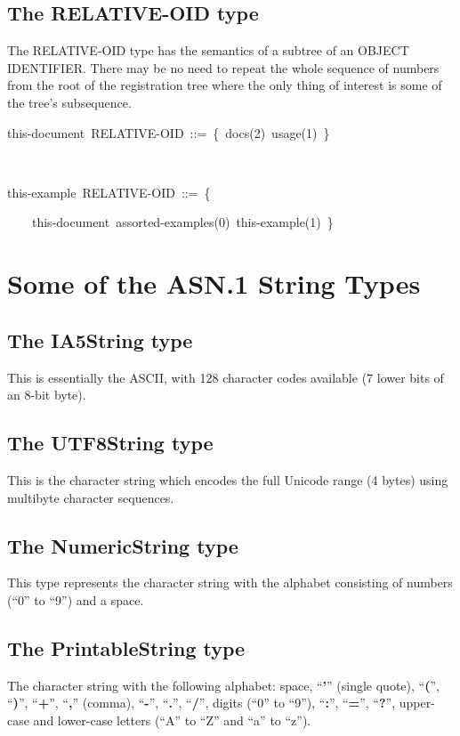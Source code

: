 \documentclass[english,oneside,12pt]{book}
\newenvironment{lyxcode}
{\par\begin{list}{}{
\setlength{\rightmargin}{\leftmargin}
\setlength{\listparindent}{0pt}%
\raggedright
\setlength{\itemsep}{0pt}
\setlength{\parsep}{0pt}
\normalfont\ttfamily}%
 \item[]}
{\end{list}}
\begin{document}
\subsection{The RELATIVE-OID type}

The RELATIVE-OID type has the semantics of a subtree of an OBJECT
IDENTIFIER. There may be no need to repeat the whole sequence of numbers
from the root of the registration tree where the only thing of interest
is some of the tree's subsequence.
\begin{lyxcode}
this-document~RELATIVE-OID~::=~\{~docs(2)~usage(1)~\}

~

this-example~RELATIVE-OID~::=~\{

~~~~this-document~assorted-examples(0)~this-example(1)~\}
\end{lyxcode}

\section{Some of the ASN.1 String Types}


\subsection{The IA5String type}

This is essentially the ASCII, with 128 character codes available
(7 lower bits of an 8-bit byte).


\subsection{The UTF8String type}

This is the character string which encodes the full Unicode range
(4 bytes) using multibyte character sequences.


\subsection{The NumericString type}

This type represents the character string with the alphabet consisting
of numbers (``0'' to ``9'') and a space.


\subsection{The PrintableString type}

The character string with the following alphabet: space, ``\textbf{'}''
(single quote), ``\textbf{(}'', ``\textbf{)}'', ``\textbf{+}'',
``\textbf{,}'' (comma), ``\textbf{-}'', ``\textbf{.}'', ``\textbf{/}'',
digits (``0'' to ``9''), ``\textbf{:}'', ``\textbf{=}'', ``\textbf{?}'',
upper-case and lower-case letters (``A'' to ``Z'' and ``a''
to ``z'').
\end{document}
